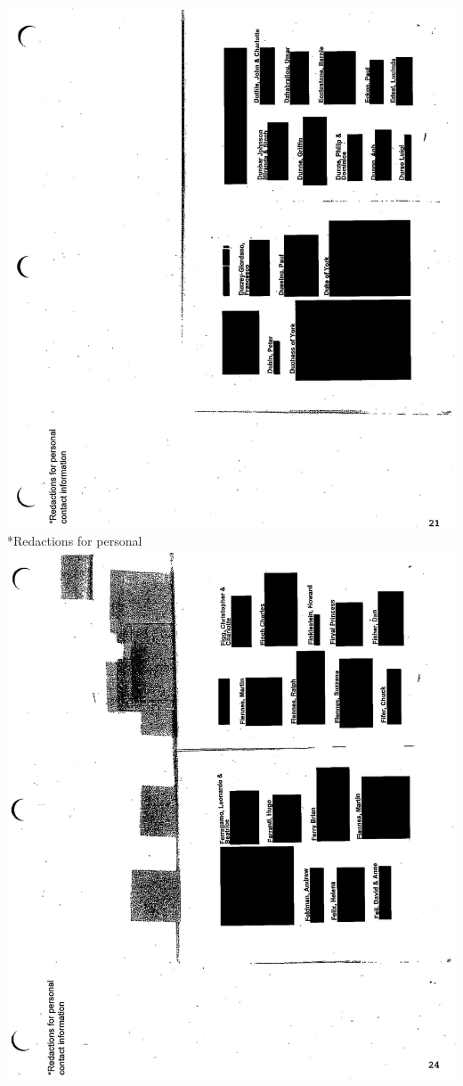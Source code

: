 \documentclass[10pt]{article}
\begin{document}
\includegraphics[max width=\textwidth, center]{2025_02_27_dd68c3d38de88f0516d9g-138}\\
*Redactions for personal\\
\includegraphics[max width=\textwidth, center]{2025_02_27_dd68c3d38de88f0516d9g-141}\\
\end{document}
